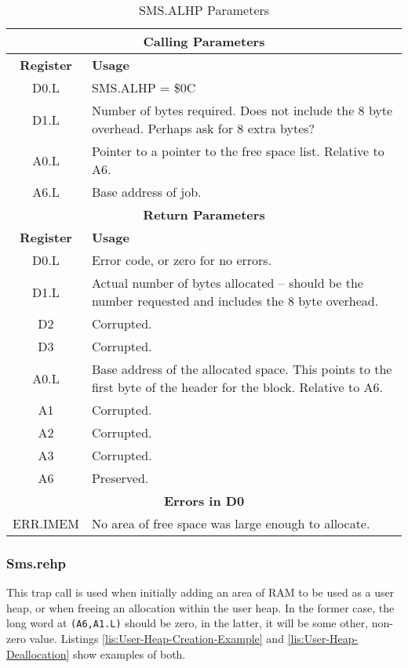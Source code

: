 \begin{table}[!h]
\begin{centering}
\begin{tabular}{|c|>{\raggedright}p{}|}
\hline 
\multicolumn{2}{|c|}{\textbf{Calling Parameters}}\tabularnewline
\hline 
\textbf{Register} & \textbf{Usage}\tabularnewline
\hline 
D0.L & SMS.ALHP = \$0C\tabularnewline
\hline 
D1.L & Number of bytes required. Does not include the 8 byte overhead. Perhaps
ask for 8 extra bytes?\tabularnewline
\hline 
A0.L & Pointer to a pointer to the free space list. Relative to A6.\tabularnewline
\hline 
A6.L & Base address of job.\tabularnewline
\hline 
\multicolumn{2}{|c|}{\textbf{Return Parameters}}\tabularnewline
\hline 
\textbf{Register} & \textbf{Usage}\tabularnewline
\hline 
D0.L & Error code, or zero for no errors.\tabularnewline
\hline 
D1.L & Actual number of bytes allocated -- should be the number requested
and includes the 8 byte overhead.\tabularnewline
\hline 
D2 & Corrupted.\tabularnewline
\hline 
D3 & Corrupted.\tabularnewline
\hline 
A0.L & Base address of the allocated space. This points to the first byte
of the header for the block. Relative to A6.\tabularnewline
\hline 
A1 & Corrupted.\tabularnewline
\hline 
A2 & Corrupted.\tabularnewline
\hline 
A3 & Corrupted.\tabularnewline
\hline 
A6 & Preserved.\tabularnewline
\hline 
\multicolumn{2}{|c|}{\textbf{Errors in D0}}\tabularnewline
\hline 
ERR.IMEM & No area of free space was large enough to allocate.\tabularnewline
\hline 
\end{tabular}
\par\end{centering}
\caption{SMS.ALHP Parameters\label{tab:SMS.ALHP-Parameters}}
\end{table}


\subsubsection{Sms.rehp}

This trap call is used when initially adding an area of RAM to be
used as a user heap, or when freeing an allocation within the user
heap. In the former case, the long word at \texttt{(A6,A1.L)} should
be zero, in the latter, it will be some other, non-zero value. Listings
\ref{lis:User-Heap-Creation-Example} and \ref{lis:User-Heap-Deallocation}
show examples of both.


